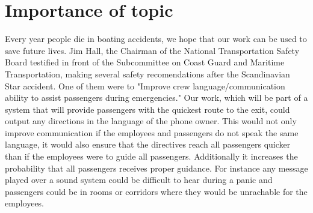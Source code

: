 \chapter{Importance of topic}
\label{ch:importance}

Every year people die in boating accidents, we hope that our work can be
used to save future lives. Jim Hall, the Chairman of the National Transportation 
Safety Board testified in front of the Subcommittee on Coast Guard and Maritime 
Transportation, making several safety recomendations after the Scandinavian Star
accident. One of them were to "Improve crew language/communication 
ability to assist passengers during emergencies." Our work, which will be part of a system
that will provide passengers with the quickest route to the exit, could output 
any directions in the language of the phone owner. This would not only improve 
communication if the employees and passengers do not speak the same language, 
it would also ensure that the directives reach all passengers quicker than if the employees 
were to guide all passengers. Additionally it increases the probability that all passengers 
receives proper guidance. For instance any message played over a sound system could be
difficult to hear during a panic and passengers could be in rooms or corridors
where they would be unrachable for the employees.
